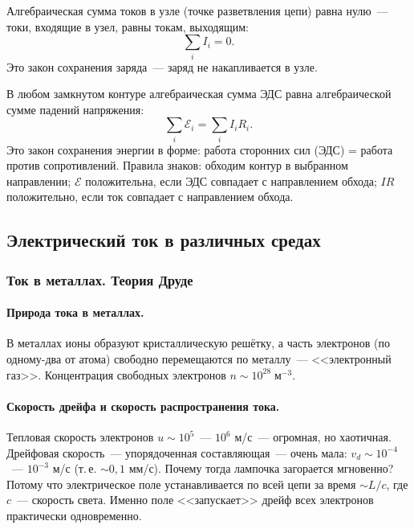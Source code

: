 \documentclass[12pt]{article}
\begin{document}
\begin{law}
	Алгебраическая сумма токов в узле (точке разветвления цепи) равна нулю~--- токи, входящие в узел, равны токам, выходящим:
	\[
		\sum_i I_i = 0.
	\]
	Это закон сохранения заряда~--- заряд не накапливается в узле.
\end{law}

\begin{law}
	В любом замкнутом контуре алгебраическая сумма ЭДС равна алгебраической сумме падений напряжения:
	\[
		\sum_i \mathcal{E}_i = \sum_i I_i R_i.
	\]
	Это закон сохранения энергии в форме: работа сторонних сил (ЭДС) = работа против сопротивлений. Правила знаков: обходим контур в выбранном направлении; $\mathcal{E}$ положительна, если ЭДС совпадает с направлением обхода; $IR$ положительно, если ток совпадает с направлением обхода.
\end{law}

\subsection{Электрический ток в различных средах}

\subsubsection{Ток в металлах. Теория Друде}

\paragraph{Природа тока в металлах.}
В металлах ионы образуют кристаллическую решётку, а часть электронов (по одному-два от атома) свободно перемещаются по металлу~--- <<электронный газ>>. Концентрация свободных электронов $n \sim 10^{28} \; \text{м}^{-3}$.

\paragraph{Скорость дрейфа и скорость распространения тока.}
Тепловая скорость электронов $u \sim 10^5$~--- $10^6$ м/с~--- огромная, но хаотичная. Дрейфовая скорость~--- упорядоченная составляющая~--- очень мала: $v_d \sim 10^{-4}$~--- $10^{-3}$ м/с (т.\,е. $\sim 0{,}1$ мм/с). Почему тогда лампочка загорается мгновенно? Потому что электрическое поле устанавливается по всей цепи за время $\sim L/c$, где $c$~--- скорость света. Именно поле <<запускает>> дрейф всех электронов практически одновременно.
\end{document}
